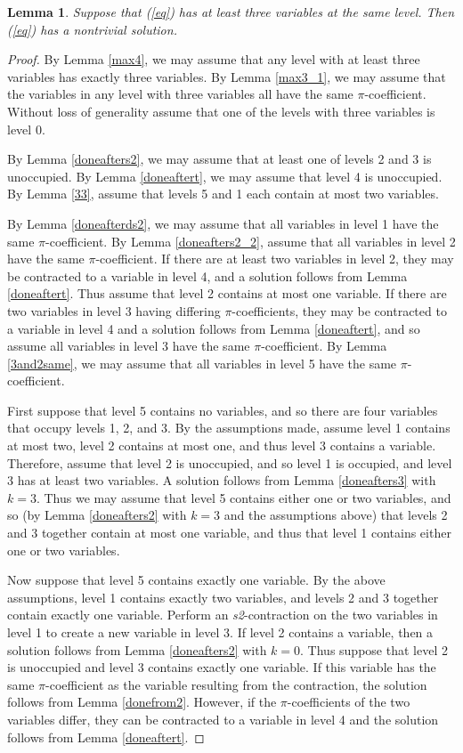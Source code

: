 \documentclass{article}
\newtheorem{lemma}{Lemma}
\begin{document}
\begin{lemma}\label{max3}
Suppose that (\ref{eq}) has at least three variables at the same level.  Then (\ref{eq}) has a nontrivial solution.
\end{lemma}
\begin{proof}
By Lemma \ref{max4}, we may assume that any level with at least three variables has exactly three variables.  By Lemma \ref{max3_1}, we may assume that the variables in any level with three variables all have the same $\pi$-coefficient.   Without loss of generality assume that one of the levels with three variables is level 0.

By Lemma \ref{doneafters2}, we may assume that at least one of levels 2 and 3 is unoccupied.  By Lemma \ref{doneaftert}, we may assume that level 4 is unoccupied. By Lemma \ref{33}, assume that levels 5 and 1 each contain at most two variables.

By Lemma \ref{doneafterds2}, we may assume that all variables in level 1 have the same $\pi$-coefficient.  By Lemma \ref{doneafters2_2},  assume that all variables in level 2 have the same $\pi$-coefficient.  If there are at least two variables in level 2, they may be contracted to a variable in level 4, and a solution follows from Lemma \ref{doneaftert}.  Thus assume that level 2 contains at most one variable.  If there are two variables in level 3 having differing $\pi$-coefficients, they may be contracted to a variable in level 4 and a solution follows from Lemma \ref{doneaftert}, and so assume all variables in level 3 have the same $\pi$-coefficient.  By Lemma \ref{3and2same}, we may assume that all variables in level 5 have the same $\pi$-coefficient.

First suppose that level 5 contains no variables, and so there are four variables that occupy levels 1, 2, and 3.  By the assumptions made, assume level 1 contains at most two, level 2 contains at most one, and thus level 3 contains a variable.  Therefore, assume that level 2 is unoccupied, and so level 1 is occupied, and level 3 has at least two variables.  A solution follows from Lemma \ref{doneafters3} with $k=3$.  Thus we may assume that level 5 contains either one or two variables, and so (by Lemma \ref{doneafters2} with $k=3$ and the assumptions above) that levels 2 and 3 together contain at most one variable, and thus that level 1 contains either one or two variables.

Now suppose that level 5 contains exactly one variable.  By the above assumptions, level 1 contains exactly two variables, and levels 2 and 3 together contain exactly one variable.  Perform an \textit{s2}-contraction on the two variables in level 1 to create a new variable in level 3.  If level 2 contains a variable, then a solution follows from Lemma \ref{doneafters2} with $k=0$.  Thus suppose that level 2 is unoccupied and level 3 contains exactly one variable.  If this variable has the same $\pi$-coefficient as the variable resulting from the contraction, the solution follows from Lemma \ref{donefrom2}.  However, if the $\pi$-coefficients of the two variables differ, they can be contracted to a variable in level 4 and the solution follows from Lemma \ref{doneaftert}.


\end{proof}
\end{document}
